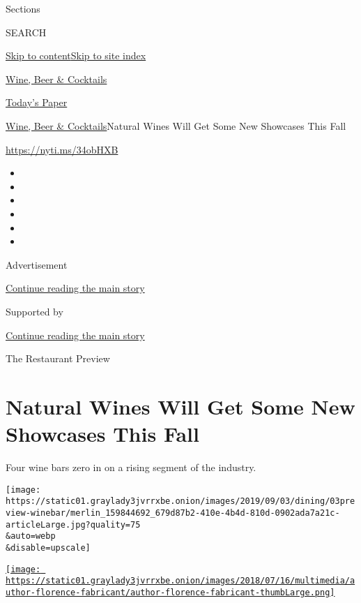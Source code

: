 Sections

SEARCH

\protect\hyperlink{site-content}{Skip to
content}\protect\hyperlink{site-index}{Skip to site index}

\href{https://www.nytimes3xbfgragh.onion/section/food/drinks}{Wine, Beer
\& Cocktails}

\href{https://myaccount.nytimes3xbfgragh.onion/auth/login?response_type=cookie\&client_id=vi}{}

\href{https://www.nytimes3xbfgragh.onion/section/todayspaper}{Today's
Paper}

\href{/section/food/drinks}{Wine, Beer \& Cocktails}\textbar{}Natural
Wines Will Get Some New Showcases This Fall

\url{https://nyti.ms/34obHXB}

\begin{itemize}
\item
\item
\item
\item
\item
\item
\end{itemize}

Advertisement

\protect\hyperlink{after-top}{Continue reading the main story}

Supported by

\protect\hyperlink{after-sponsor}{Continue reading the main story}

The Restaurant Preview

\hypertarget{natural-wines-will-get-some-new-showcases-this-fall}{%
\section{Natural Wines Will Get Some New Showcases This
Fall}\label{natural-wines-will-get-some-new-showcases-this-fall}}

Four wine bars zero in on a rising segment of the industry.

\texttt{[image: https://static01.graylady3jvrrxbe.onion/images/2019/09/03/dining/03preview-winebar/merlin\_159844692\_679d87b2-410e-4b4d-810d-0902ada7a21c-articleLarge.jpg?quality=75\\\&auto=webp\\\&disable=upscale]}

\href{https://www.nytimes3xbfgragh.onion/by/florence-fabricant}{\texttt{[image: https://static01.graylady3jvrrxbe.onion/images/2018/07/16/multimedia/author-florence-fabricant/author-florence-fabricant-thumbLarge.png]}}

